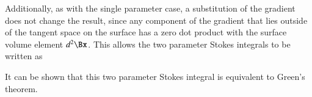 Additionally, as with the single parameter case, a substitution of the gradient does not change the result, since any component of the gradient that lies outside of the tangent space on the surface has a zero dot product with the surface volume element \( d^2 \Bx \).
This allows the two parameter Stokes integrals to be written as


It can be shown that this two parameter Stokes integral is equivalent to Green's theorem.
